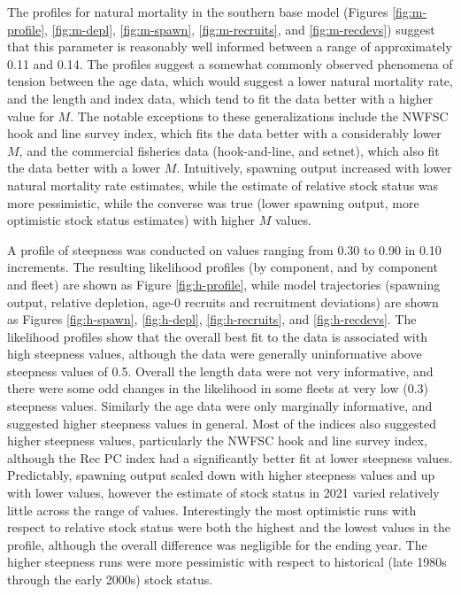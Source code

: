 \documentclass[
  english,
  a4paper,
]{article}
\begin{document}
The profiles for natural mortality in the southern base model (Figures \ref{fig:m-profile}, \ref{fig:m-depl}, \ref{fig:m-spawn}, \ref{fig:m-recruits}, and \ref{fig:m-recdevs}) suggest that this parameter is reasonably well informed between a range of approximately 0.11 and 0.14. The profiles suggest a somewhat commonly observed phenomena of tension between the age data, which would suggest a lower natural mortality rate, and the length and index data, which tend to fit the data better with a higher value for \(M\). The notable exceptions to these generalizations include the NWFSC hook and line survey index, which fits the data better with a considerably lower \(M\), and the commercial fisheries data (hook-and-line, and setnet), which also fit the data better with a lower \(M\). Intuitively, spawning output increased with lower natural mortality rate estimates, while the estimate of relative stock status was more pessimistic, while the converse was true (lower spawning output, more optimistic stock status estimates) with higher \(M\) values.

A profile of steepness was conducted on values ranging from 0.30 to 0.90 in 0.10 increments. The resulting likelihood profiles (by component, and by component and fleet) are shown as Figure \ref{fig:h-profile}, while model trajectories (spawning output, relative depletion, age-0 recruits and recruitment deviations) are shown as Figures \ref{fig:h-spawn}, \ref{fig:h-depl}, \ref{fig:h-recruits}, and \ref{fig:h-recdevs}. The likelihood profiles show that the overall best fit to the data is associated with high steepness values, although the data were generally uninformative above steepness values of 0.5. Overall the length data were not very informative, and there were some odd changes in the likelihood in some fleets at very low (0.3) steepness values. Similarly the age data were only marginally informative, and suggested higher steepness values in general. Most of the indices also suggested higher steepness values, particularly the NWFSC hook and line survey index, although the Rec PC index had a significantly better fit at lower steepness values. Predictably, spawning output scaled down with higher steepness values and up with lower values, however the estimate of stock status in 2021 varied relatively little across the range of values. Interestingly the most optimistic runs with respect to relative stock status were both the highest and the lowest values in the profile, although the overall difference was negligible for the ending year. The higher steepness runs were more pessimistic with respect to historical (late 1980s through the early 2000s) stock status.
\end{document}
